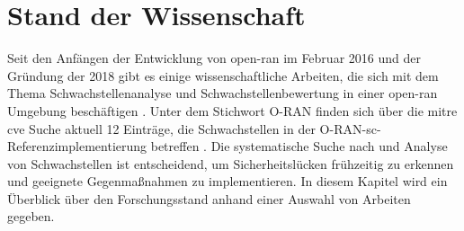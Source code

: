 \chapter{Stand der Wissenschaft}
\label{chap:forschungsstand}
Seit den Anfängen der Entwicklung von \gls{open-ran} im Februar 2016 und der Gründung der \orana{} 2018 gibt es einige wissenschaftliche Arbeiten, die sich mit dem Thema Schwachstellenanalyse und Schwachstellenbewertung in einer \gls{open-ran} Umgebung beschäftigen \autocite{ORANAlliance,GuideOpenRAN}. Unter dem Stichwort \glqq{}O-RAN\grqq{} finden sich über die \gls{mitre} \gls{cve} Suche aktuell 12 Einträge, die Schwachstellen in der O-RAN-\gls{sc}-Referenzimplementierung betreffen \autocite{CVESearchResults}. Die systematische Suche nach und Analyse von Schwachstellen ist entscheidend, um Sicherheitslücken frühzeitig zu erkennen und geeignete Gegenmaßnahmen zu implementieren. In diesem Kapitel wird ein Überblick über den Forschungsstand anhand einer Auswahl von Arbeiten gegeben.

%
